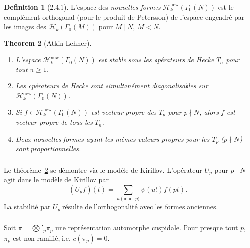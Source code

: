 \documentclass[11pt,a4paper]{amsart}
\theoremstyle{plain}
\newtheorem{theorem}{Theorem}[section]
\theoremstyle{definition}
\newtheorem{definition}[theorem]{Definition}
\theoremstyle{remark}
\newcommand{\cH}{\mathcal{H}}
\begin{document}
\subsubsection{}
\label{sec:2.4.2}

\begin{definition}[2.4.1] \label{def:2.4.1}
L'espace des \emph{nouvelles formes} $\cH_k^{\text{new}}(\Gamma_0(N))$ est le compl\'ement orthogonal (pour le produit de Petersson) de l'espace engendr\'e par les images des $\cH_k(\Gamma_0(M))$ pour $M \mid N$, $M < N$.
\end{definition}

\begin{theorem}[Atkin-Lehner] \label{thm:atkin-lehner}
\begin{enumerate}
\item[(i)] L'espace $\cH_k^{\text{new}}(\Gamma_0(N))$ est stable sous les op\'erateurs de Hecke $T_n$ pour tout $n \geq 1$.
\item[(ii)] Les op\'erateurs de Hecke sont simultan\'ement diagonalisables sur $\cH_k^{\text{new}}(\Gamma_0(N))$.
\item[(iii)] Si $f \in \cH_k^{\text{new}}(\Gamma_0(N))$ est vecteur propre des $T_p$ pour $p \nmid N$, alors $f$ est vecteur propre de tous les $T_n$.
\item[(iv)] Deux nouvelles formes ayant les m\^emes valeurs propres pour les $T_p$ ($p \nmid N$) sont proportionnelles.
\end{enumerate}
\end{theorem}

\subsubsection{}
\label{sec:2.4.3}

Le th\'eor\`eme~\ref{thm:atkin-lehner} se d\'emontre via le mod\`ele de Kirillov. L'op\'erateur $U_p$ pour $p \mid N$ agit dans le mod\`ele de Kirillov par
\[ (U_p f)(t) = \sum_{u \pmod{p}} \psi(ut) f(pt). \]
La stabilit\'e par $U_p$ r\'esulte de l'orthogonalit\'e avec les formes anciennes.

\subsubsection{}
\label{sec:2.4.4}

Soit $\pi = \bigotimes'_p \pi_p$ une repr\'esentation automorphe cuspidale. Pour presque tout $p$, $\pi_p$ est non ramifi\'e, i.e. $c(\pi_p) = 0$.
\end{document}

